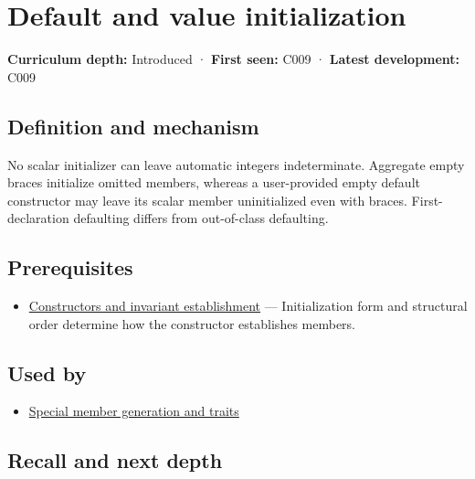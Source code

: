 \hypertarget{appendix-ba8c1a9fe03f}{}\label{referencestart:appendix-ba8c1a9fe03f}
\section{Default and value initialization}\label{appendix-ba8c1a9fe03f-default-and-value-initialization}

\textbf{Curriculum depth:} Introduced · \textbf{First seen:} C009 · \textbf{Latest development:} C009

\subsection{Definition and mechanism}\label{appendix-ba8c1a9fe03f-definition-and-mechanism}

No scalar initializer can leave automatic integers indeterminate. Aggregate empty braces initialize omitted members, whereas a user-provided empty default constructor may leave its scalar member uninitialized even with braces. First-declaration defaulting differs from out-of-class defaulting.

\subsection{Prerequisites}\label{appendix-ba8c1a9fe03f-prerequisites}

\begin{itemize}
\tightlist
\item
  \hyperref[appendix-7f8ec83d0886]{Constructors and invariant establishment} --- Initialization form and structural order determine how the constructor establishes members.
\end{itemize}

\subsection{Used by}\label{appendix-ba8c1a9fe03f-used-by}

\begin{itemize}
\tightlist
\item
  \hyperref[appendix-42e02a12c694]{Special member generation and traits}
\end{itemize}

\subsection{Recall and next depth}\label{appendix-ba8c1a9fe03f-recall-and-next-depth}

